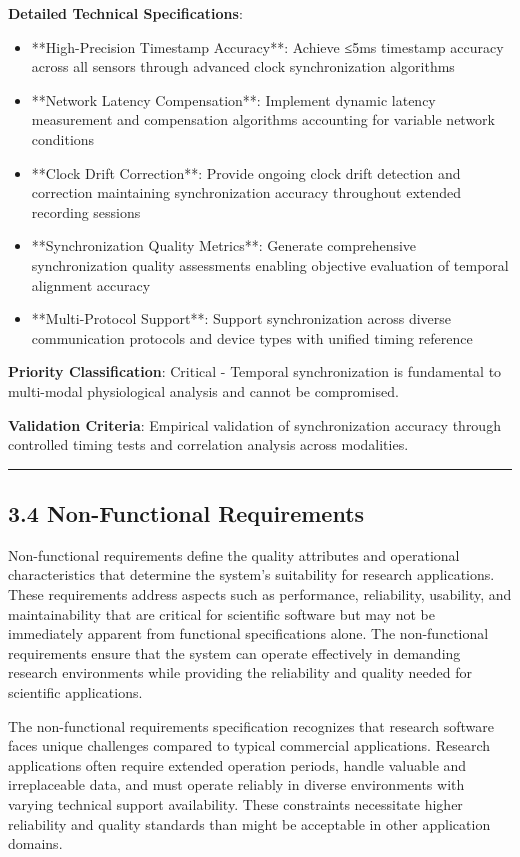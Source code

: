 \documentclass[12pt,a4paper]{article}
\begin{document}
\textbf{Detailed Technical Specifications}:

\begin{itemize}
\item **High-Precision Timestamp Accuracy**: Achieve ≤5ms timestamp accuracy across all sensors through advanced clock
  synchronization algorithms
\item **Network Latency Compensation**: Implement dynamic latency measurement and compensation algorithms accounting for
  variable network conditions
\item **Clock Drift Correction**: Provide ongoing clock drift detection and correction maintaining synchronization accuracy
  throughout extended recording sessions
\item **Synchronization Quality Metrics**: Generate comprehensive synchronization quality assessments enabling objective
  evaluation of temporal alignment accuracy
\item **Multi-Protocol Support**: Support synchronization across diverse communication protocols and device types with
  unified timing reference

\end{itemize}
\textbf{Priority Classification}: Critical - Temporal synchronization is fundamental to multi-modal physiological analysis
and cannot be compromised.

\textbf{Validation Criteria}: Empirical validation of synchronization accuracy through controlled timing tests and
correlation analysis across modalities.

\hrule

\subsection{3.4 Non-Functional Requirements}

Non-functional requirements define the quality attributes and operational characteristics that determine the system's
suitability for research applications. These requirements address aspects such as performance, reliability, usability,
and maintainability that are critical for scientific software but may not be immediately apparent from functional
specifications alone. The non-functional requirements ensure that the system can operate effectively in demanding
research environments while providing the reliability and quality needed for scientific applications.

The non-functional requirements specification recognizes that research software faces unique challenges compared to
typical commercial applications. Research applications often require extended operation periods, handle valuable and
irreplaceable data, and must operate reliably in diverse environments with varying technical support availability. These
constraints necessitate higher reliability and quality standards than might be acceptable in other application domains.
\end{document}

